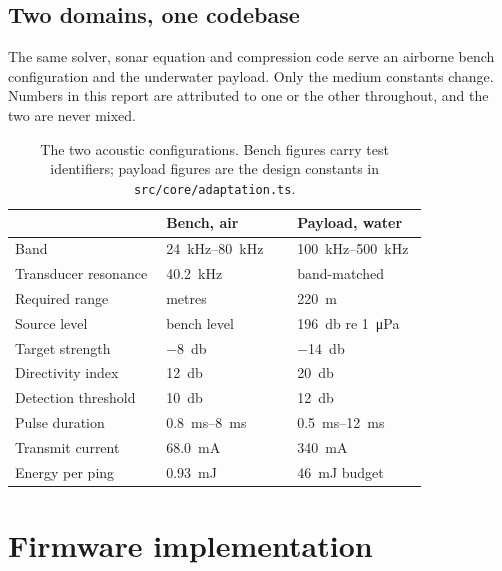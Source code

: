 \documentclass[11pt,a4paper]{article}
\begin{document}
\subsection{Two domains, one codebase}

The same solver, sonar equation and compression code serve an airborne bench
configuration and the underwater payload. Only the medium constants change.
Numbers in this report are attributed to one or the other throughout, and the
two are never mixed.

\begin{table}[htbp]
\centering
\small
\begin{tabularx}{\linewidth}{L{0.30\linewidth}R{0.26\linewidth}R{0.26\linewidth}}
\toprule
& \textbf{Bench, air} & \textbf{Payload, water} \\
\midrule
Band & \SIrange{24}{80}{\kilo\hertz} & \SIrange{100}{500}{\kilo\hertz} \\
Transducer resonance & \SI{40.2}{\kilo\hertz}  & band-matched \\
Required range & metres & \SI{220}{\metre} \\
Source level & bench level & \SI{196}{\decibel} re \SI{1}{\micro\pascal} \\
Target strength & \SI{-8}{\decibel} & \SI{-14}{\decibel} \\
Directivity index & \SI{12}{\decibel} & \SI{20}{\decibel} \\
Detection threshold & \SI{10}{\decibel} & \SI{12}{\decibel} \\
Pulse duration & \SIrange{0.8}{8}{\milli\second} & \SIrange{0.5}{12}{\milli\second} \\
Transmit current & \SI{68.0}{\milli\ampere}  & \SI{340}{\milli\ampere} \\
Energy per ping & \SI{0.93}{\milli\joule}  & \SI{46}{\milli\joule} budget \\
\bottomrule
\end{tabularx}
\caption{The two acoustic configurations. Bench figures carry test identifiers;
payload figures are the design constants in \texttt{src/core/adaptation.ts}.}
\label{tab:domains}
\end{table}

\section{Firmware implementation}
\label{sec:firmware}
\end{document}
